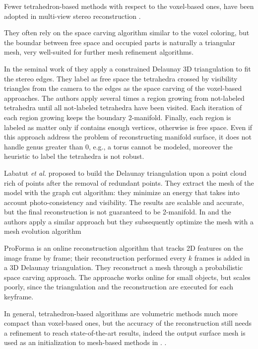Fewer tetrahedron-based methods with respect to the voxel-based ones, have been adopted in multi-view stereo reconstruction
\cite{faugeras_et_al_90,labatut2007efficient,salman2010surface,vu_et_al_2012,hiep2009towards,Pan_et_al09}.

They often rely on the space carving algorithm similar to the voxel coloring, but the boundar between free space and occupied parts is naturally a triangular mesh, very well-suited for further mesh refinement algorithms.

In the seminal work of \cite{faugeras_et_al_90} they apply a constrained Delaunay 3D triangulation to fit the stereo edges. They label  as free space the tetrahedra crossed by visibility triangles from the camera to the edges as the space carving of the voxel-based approaches. The authors apply several times a region growing from not-labeled tetrahedra  until all not-labeled tetrahedra have been visited. Each iteration of each region growing keeps the boundary 2-manifold. Finally, each region is labeled as matter only if contains enough vertices, otherwise is free space. 
Even if this approach address the problem of reconstructing manifold surface, it does not handle genus greater than 0, e.g., a torus cannot be modeled, moreover the heuristic to label the tetrahedra is not robust.

Labatut \emph{et al.} \cite{labatut2007efficient} proposed to build the Delaunay triangulation upon a point cloud rich of points after the removal of redundant points. 
They extract the mesh of the model with the graph cut algorithm: they minimize an energy that takes into account photo-consistency and visibility. The results are scalable and accurate, but the final reconstruction is not guaranteed to be 2-manifold.
In \cite{hiep2009towards} and \cite{vu_et_al_2012} the authors apply a similar approach but they subsequently optimize the mesh with a mesh evolution algorithm

ProForma \cite{Pan_et_al09} is an online reconstruction algorithm that tracks 2D features on the image frame by frame; their reconstruction performed every $k$ frames is added in a 3D Delaunay triangulation. They reconstruct a mesh through a probabilistic space carving approach. The approache works online for small objects, but scales poorly, since the triangulation and the reconstruction are executed for each keyframe.

In general, tetrahedron-based algorithms are volumetric methods  much more compact than voxel-based ones, but the accuracy of the reconstruction still needs a refinement to reach state-of-the-art results, indeed the output surface mesh is used as an initialization to mesh-based methods in \cite{vu_et_al_2012,hiep2009towards,salman2010surface}.
.
